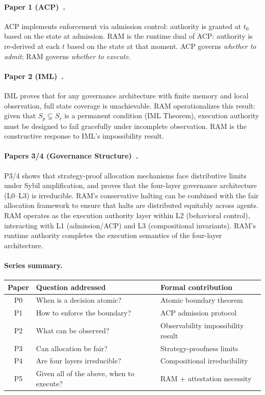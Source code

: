 \documentclass[11pt]{article}
\newcommand{\Sr}{S_r}
\newcommand{\Sp}{S_p}
\begin{document}
\paragraph{Paper 1 (ACP)~\cite{fernandez2026b}.}
ACP implements enforcement via admission control: authority is granted at
$t_0$ based on the state at admission.
RAM is the runtime dual of ACP: authority is re-derived at each $t$ based
on the state at that moment.
ACP governs \emph{whether to admit}; RAM governs \emph{whether to execute}.

\paragraph{Paper 2 (IML)~\cite{fernandez2026c}.}
IML proves that for any governance architecture with finite memory and local
observation, full state coverage is unachievable.
RAM operationalizes this result: given that $\Sp \subsetneq \Sr$ is a
permanent condition (IML Theorem), execution authority must be designed to
fail gracefully under incomplete observation.
RAM is the constructive response to IML's impossibility result.

\paragraph{Papers 3/4 (Governance Structure)~\cite{fernandez2026govstr}.}
P3/4 shows that strategy-proof allocation mechanisms face distributive limits
under Sybil amplification, and proves that the four-layer governance architecture
(L0--L3) is irreducible. RAM's conservative halting can be combined with the
fair allocation framework to ensure that halts are distributed equitably across agents.
RAM operates as the execution authority layer within L2 (behavioral control),
interacting with L1 (admission/ACP) and L3 (compositional invariants).
RAM's runtime authority completes the execution semantics of the four-layer
architecture.

\paragraph{Series summary.}
\begin{center}
\small
\begin{tabular}{cll}
\toprule
\textbf{Paper} & \textbf{Question addressed} & \textbf{Formal contribution} \\
\midrule
P0 & When is a decision atomic? & Atomic boundary theorem \\
P1 & How to enforce the boundary? & ACP admission protocol \\
P2 & What can be observed? & Observability impossibility result \\
P3 & Can allocation be fair? & Strategy-proofness limits \\
P4 & Are four layers irreducible? & Compositional irreducibility \\
P5 & Given all of the above, when to execute? & RAM + attestation necessity \\
\bottomrule
\end{tabular}
\end{center}
\end{document}
